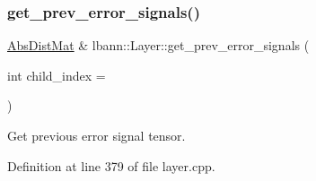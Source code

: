 \subsubsection{\texorpdfstring{get\+\_\+prev\+\_\+error\+\_\+signals()}{get\_prev\_error\_signals()}\hspace{0.1cm}{\footnotesize\ttfamily [1/2]}}
{\footnotesize\ttfamily \hyperlink{base_8hpp_a9a697a504ae84010e7439ffec862b470}{Abs\+Dist\+Mat} \& lbann\+::\+Layer\+::get\+\_\+prev\+\_\+error\+\_\+signals (\begin{DoxyParamCaption}\item[{int}]{child\+\_\+index = {} }\end{DoxyParamCaption})}

Get previous error signal tensor. 

Definition at line 379 of file layer.\+cpp.


